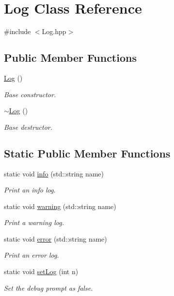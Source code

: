\hypertarget{class_log}{\section{Log Class Reference}
\label{class_log}
}


{\ttfamily \#include $<$Log.\+hpp$>$}

\subsection*{Public Member Functions}
\begin{DoxyCompactItemize}
\item 
\hyperlink{class_log_af6071a60aa52b6c1b511f99b4bc1b8fe}{Log} ()
\begin{DoxyCompactList}\small\item\em Base constructor. \end{DoxyCompactList}\item 
\hypertarget{class_log_a0fbfda88fbee5027c89f6eb121059360}{\hyperlink{class_log_a0fbfda88fbee5027c89f6eb121059360}{$\sim$\+Log} ()}\label{class_log_a0fbfda88fbee5027c89f6eb121059360}

\begin{DoxyCompactList}\small\item\em Base destructor. \end{DoxyCompactList}\end{DoxyCompactItemize}
\subsection*{Static Public Member Functions}
\begin{DoxyCompactItemize}
\item 
static void \hyperlink{class_log_a63764a6e2521a2dda6a7bd2562aa96d3}{info} (std\+::string name)
\begin{DoxyCompactList}\small\item\em Print an info log. \end{DoxyCompactList}\item 
static void \hyperlink{class_log_a2060ccdfdc1600ea41ab34c646aa4b54}{warning} (std\+::string name)
\begin{DoxyCompactList}\small\item\em Print a warning log. \end{DoxyCompactList}\item 
static void \hyperlink{class_log_a5e872491a64db4fd358d456aab0b410e}{error} (std\+::string name)
\begin{DoxyCompactList}\small\item\em Print an error log. \end{DoxyCompactList}\item 
static void \hyperlink{class_log_a86910e8305e08485f3e37763d6950e1f}{set\+Log} (int n)
\begin{DoxyCompactList}\small\item\em Set the debug prompt as false. \end{DoxyCompactList}\end{DoxyCompactItemize}


